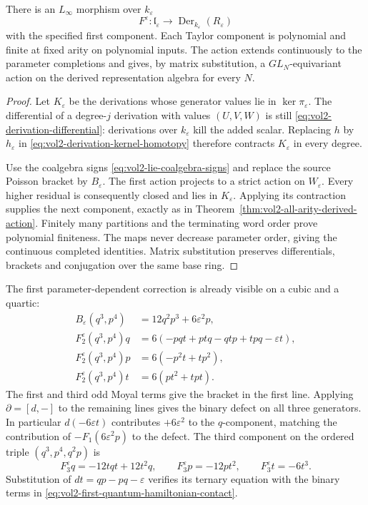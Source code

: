 \begin{theorem}\label{thm:vol2-coherent-coefficient-quantum-action}
There is an $L_\infty$ morphism over $k_\varepsilon$
\[
 F^\varepsilon:\mathfrak l_\varepsilon
       \longrightarrow\operatorname{Der}_{k_\varepsilon}
                                   (R_\varepsilon)
\]
with the specified first component. Each Taylor component
is polynomial and finite at fixed arity on polynomial inputs.
The action extends continuously to the parameter completions
and gives, by matrix substitution, a $GL_N$-equivariant action
on the derived representation algebra for every $N$.
\end{theorem}
\begin{proof}
Let $K_\varepsilon$ be the derivations whose generator values
lie in $\ker\pi_\varepsilon$. The differential of a
degree-$j$ derivation with values $(U,V,W)$ is still
\eqref{eq:vol2-derivation-differential}: derivations over
$k_\varepsilon$ kill the added scalar.
Replacing $h$ by $h_\varepsilon$ in
\eqref{eq:vol2-derivation-kernel-homotopy} therefore contracts
$K_\varepsilon$ in every degree.

Use the coalgebra signs
\eqref{eq:vol2-lie-coalgebra-signs} and replace the source
Poisson bracket by $B_\varepsilon$. The first action projects
to a strict action on $W_\varepsilon$. Every higher residual
is consequently closed and lies in $K_\varepsilon$.
Applying its contraction supplies the next component, exactly
as in Theorem~\ref{thm:vol2-all-arity-derived-action}.
Finitely many partitions and the terminating word order prove
polynomial finiteness. The maps never decrease parameter
order, giving the continuous completed identities. Matrix
substitution preserves differentials, brackets and
conjugation over the same base ring.
\end{proof}

The first parameter-dependent correction is already visible
on a cubic and a quartic:
\begin{equation}\label{eq:vol2-first-quantum-hamiltonian-contact}
 \begin{aligned}
 B_\varepsilon(q^3,p^4)&=12q^2p^3+6\varepsilon^2p,\\
 F^\varepsilon_2(q^3,p^4)q
     &=6(-pqt+ptq-qtp+tpq-\varepsilon t),\\
 F^\varepsilon_2(q^3,p^4)p&=6(-p^2t+tp^2),\\
 F^\varepsilon_2(q^3,p^4)t&=6(pt^2+tpt).
 \end{aligned}
\end{equation}
The first and third odd Moyal terms give the bracket in the
first line. Applying $\partial=[d,-]$ to the remaining lines
gives the binary defect on all three generators. In particular
$d(-6\varepsilon t)$ contributes $+6\varepsilon^2$ to the
$q$-component, matching the contribution of
$-F_1(6\varepsilon^2p)$ to the defect.
The third component on the ordered triple
$(q^3,p^4,q^2p)$ is
\begin{equation}\label{eq:vol2-quantum-ternary-action}
 F^\varepsilon_3q=-12tqt+12t^2q,
 \qquad F^\varepsilon_3p=-12pt^2,
 \qquad F^\varepsilon_3t=-6t^3.
\end{equation}
Substitution of $dt=qp-pq-\varepsilon$ verifies its ternary
equation with the binary terms in
\eqref{eq:vol2-first-quantum-hamiltonian-contact}.


